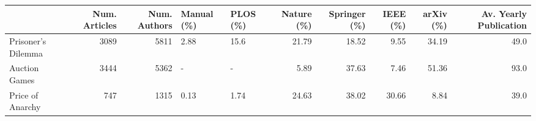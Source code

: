 \begin{tabular}{lrrllrrrrr}
\toprule
{} &  Num. Articles &  Num. Authors & Manual (\%) & PLOS (\%) &  Nature (\%) &  Springer (\%) &  IEEE (\%) &  arXiv (\%) &  Av. Yearly Publication \\
\midrule
Prisoner's Dilemma &           3089 &          5811 &       2.88 &     15.6 &       21.79 &         18.52 &      9.55 &      34.19 &                    49.0 \\
Auction Games      &           3444 &          5362 &          - &        - &        5.89 &         37.63 &      7.46 &      51.36 &                    93.0 \\
Price of Anarchy   &            747 &          1315 &       0.13 &     1.74 &       24.63 &         38.02 &     30.66 &       8.84 &                    39.0 \\
\bottomrule
\end{tabular}
